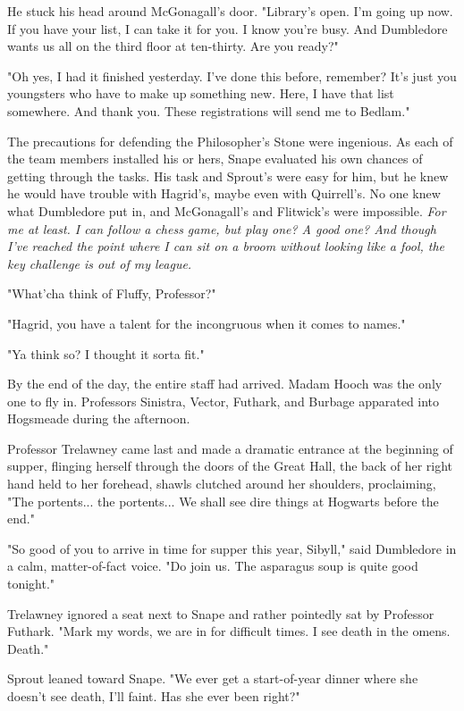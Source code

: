 He stuck his head around McGonagall's door. "Library's open. I'm going up now. If you have your list, I can take it for you. I know you're busy. And Dumbledore wants us all on the third floor at ten-thirty. Are you ready?"

"Oh yes, I had it finished yesterday. I've done this before, remember? It's just you youngsters who have to make up something new. Here, I have that list somewhere. And thank you. These registrations will send me to Bedlam."

The precautions for defending the Philosopher's Stone were ingenious. As each of the team members installed his or hers, Snape evaluated his own chances of getting through the tasks. His task and Sprout's were easy for him, but he knew he would have trouble with Hagrid's, maybe even with Quirrell's. No one knew what Dumbledore put in, and McGonagall's and Flitwick's were impossible. \emph{For me at least. I can follow a chess game, but play one? A good one? And though I've reached the point where I can sit on a broom without looking like a fool, the key challenge is out of my league.}

"What'cha think of Fluffy, Professor?"

"Hagrid, you have a talent for the incongruous when it comes to names."

"Ya think so? I thought it sorta fit."

By the end of the day, the entire staff had arrived. Madam Hooch was the only one to fly in. Professors Sinistra, Vector, Futhark, and Burbage apparated into Hogsmeade during the afternoon.

Professor Trelawney came last and made a dramatic entrance at the beginning of supper, flinging herself through the doors of the Great Hall, the back of her right hand held to her forehead, shawls clutched around her shoulders, proclaiming, "The portents... the portents... We shall see dire things at Hogwarts before the end."

"So good of you to arrive in time for supper this year, Sibyll," said Dumbledore in a calm, matter-of-fact voice. "Do join us. The asparagus soup is quite good tonight."

Trelawney ignored a seat next to Snape and rather pointedly sat by Professor Futhark. "Mark my words, we are in for difficult times. I see death in the omens. Death."

Sprout leaned toward Snape. "We ever get a start-of-year dinner where she doesn't see death, I'll faint. Has she ever been right?"

